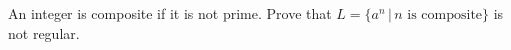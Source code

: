 An integer is composite if it is not prime. Prove that $L =
\{a^n\,|\, n \text{ is composite} \}$ is not regular.
